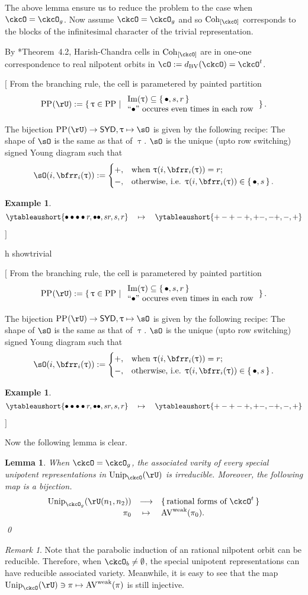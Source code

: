 \documentclass[12pt,a4paper]{amsart}
\let\ytb=\ytableaushort
\newcommand{\trivial}[2][]{\if\relax\detokenize{#1}\relax
  {%
      \color{orange} \vspace{0em} $[$  #2 $]$
      \color{black}
  }
  \else
\ifx#1h
\ifcsname showtrivial\endcsname
{%
    \color{orange} \vspace{0em}  $[$ #2 $]$
    \color{black}
}
\fi
\else {\red Wrong argument!} \fi
\fi
}
\newcommand{\AV}{\mathrm{AV}}
\def\Im{\operatorname{Im}}
\numberwithin{equation}{section}
\newtheorem{lem}[thm]{Lemma}
\newtheorem{eg}[thm]{Example}
\theoremstyle{remark}
\newtheorem*{remark}{Remark}
\def\Unip{\mathrm{Unip}}
\def\wAV{\AV^{\mathrm{weak}}}
\def\dBV{d_{\mathrm{BV}}}
\def\SYD{\mathsf{SYD}}
\def\Cint#1{\Coh_{[#1]}}
\def\PP#1{\mathrm{PP}_{#1}}
\def\Im{\mathrm{Im}}
\def\Coh{\mathrm{Coh}}
\begin{document}
The above lemma ensure us to reduce the problem to the case when $\ckcO = \ckcO_g$. 
Now assume $\ckcO = \ckcO_g$ and so $\Cint{\ckcO}$ corresponds to the blocks of 
the infinitesimal character of the trivial representation.   

By \cite{BV.W}*{Theorem~4.2},  Harish-Chandra cells in $\Cint{\ckcO}$ are in one-one
correspondence to real nilpotent orbits in $\cO:=\dBV(\ckcO)=\ckcO^t$. 

\trivial{
From the branching rule, the cell is parametered by painted partition 
\[
\PP{}(\rU):=\set{\uptau\in \PP{}| \begin{array}{l}\Im (\uptau) \subseteq  \set{\bullet, s,r}\\
  \text{``$\bullet$'' occures even times in each row}
\end{array} 
  }.  
\]

The bijection $\PP{}(\rU)\rightarrow \SYD, \uptau\mapsto \sO$ is given by the following recipe:
The shape of $\sO$ is the same as that of $\uptau$. 
$\sO$ is the unique (upto row switching) signed Young diagram such that
\[
  \sO(i,\bfrr_i(\uptau)) := \begin{cases}
    +,  & \text{when }\uptau(i,\bfrr_i(\uptau))=r;\\
    -,  & \text{otherwise, i.e. }\uptau(i,\bfrr_i(\uptau))\in \set{\bullet,s}.
  \end{cases}
\] 

\begin{eg}
  \[
 \ytb{\bullet\bullet\bullet\bullet r,\bullet\bullet , sr,s,r}   
 \quad
 \mapsto\quad
 \ytb{+-+-+,+-, -+,-,+}   
  \]
\end{eg}
}

Now the following lemma is clear. 
\begin{lem}
When $\ckcO=\ckcO_g$, the associated varity of every special unipotent representations in $\Unip_\ckcO(\rU)$  
is irreducible. Moreover, the following map  is a bijection. 
\[  
  \begin{array}{rcl}
  \Unip_{\ckcO_g}(\rU(n_1,n_2)) &\longrightarrow& \set{\text{rational forms of $\ckcO^t$}}\\
  \pi_0 & \mapsto & \wAV(\pi_0).
  \end{array}
\]
\qed
\end{lem}
\begin{remark}
  Note that the parabolic induction of an rational nilpotent orbit can be reducible. 
  Therefore, when $\ckcO_b\neq \emptyset$, the special unipotent representations can have
  reducible associated variety. Meanwhile, it is easy to see that the map
  $\Unip_{\ckcO}(\rU) \ni \pi \mapsto\wAV(\pi)$ is still injective. 
\end{remark}
\end{document}
